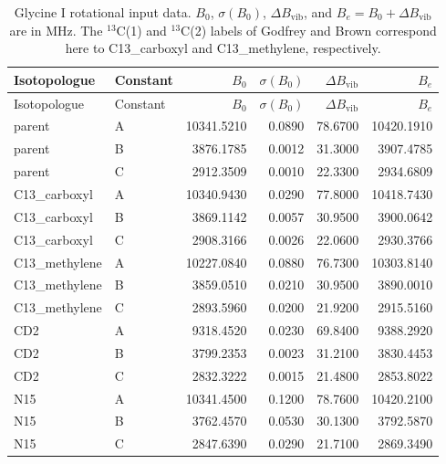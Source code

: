 \documentclass[12pt]{article}
\begin{document}
\begin{longtable}{llrrrr}
\caption{Glycine I rotational input data. $B_0$, $\sigma(B_0)$, $\Delta B_\mathrm{vib}$, and $B_e=B_0+\Delta B_\mathrm{vib}$ are in MHz. The $^{13}$C(1) and $^{13}$C(2) labels of Godfrey and Brown correspond here to C13\_carboxyl and C13\_methylene, respectively.}\label{tab:si-glycine-I-inputdata}\\
\toprule
Isotopologue & Constant & $B_0$ & $\sigma(B_0)$ & $\Delta B_\mathrm{vib}$ & $B_e$ \\
\midrule
\endfirsthead
\toprule
Isotopologue & Constant & $B_0$ & $\sigma(B_0)$ & $\Delta B_\mathrm{vib}$ & $B_e$ \\
\midrule
\endhead
parent & A & 10341.5210 & 0.0890 & 78.6700 & 10420.1910 \\
parent & B & 3876.1785 & 0.0012 & 31.3000 & 3907.4785 \\
parent & C & 2912.3509 & 0.0010 & 22.3300 & 2934.6809 \\
C13\_carboxyl & A & 10340.9430 & 0.0290 & 77.8000 & 10418.7430 \\
C13\_carboxyl & B & 3869.1142 & 0.0057 & 30.9500 & 3900.0642 \\
C13\_carboxyl & C & 2908.3166 & 0.0026 & 22.0600 & 2930.3766 \\
C13\_methylene & A & 10227.0840 & 0.0880 & 76.7300 & 10303.8140 \\
C13\_methylene & B & 3859.0510 & 0.0210 & 30.9500 & 3890.0010 \\
C13\_methylene & C & 2893.5960 & 0.0200 & 21.9200 & 2915.5160 \\
CD2 & A & 9318.4520 & 0.0230 & 69.8400 & 9388.2920 \\
CD2 & B & 3799.2353 & 0.0023 & 31.2100 & 3830.4453 \\
CD2 & C & 2832.3222 & 0.0015 & 21.4800 & 2853.8022 \\
N15 & A & 10341.4500 & 0.1200 & 78.7600 & 10420.2100 \\
N15 & B & 3762.4570 & 0.0530 & 30.1300 & 3792.5870 \\
N15 & C & 2847.6390 & 0.0290 & 21.7100 & 2869.3490 \\
\bottomrule
\end{longtable}
\end{document}
